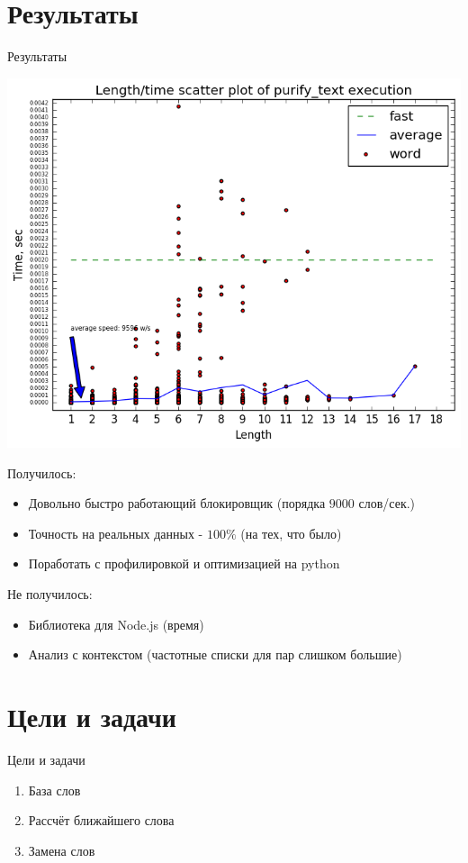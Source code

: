 \documentclass{beamer}
\begin{document}
\section{Результаты}
\begin{frame}[t]{Результаты}
    \begin{center}
        \includegraphics[width=0.70\linewidth]{../src/test/resources/plots/length_time_plot.png}
    \end{center}
\end{frame}
\begin{frame}
    Получилось:
    \begin{itemize}
        \item Довольно быстро работающий блокировщик (порядка $9000$ слов/сек.)
        \item Точность на реальных данных - $100 \%$ (на тех, что было)
        \item Поработать с профилировкой и оптимизацией на python
    \end{itemize}
    Не получилось:
    \begin{itemize}
        \item Библиотека для Node.js (время)
        \item Анализ с контекстом (частотные списки для пар слишком большие)
    \end{itemize}
\end{frame}

\section{Цели и задачи}
\begin{frame}[<+->]{Цели и задачи}
    \begin{enumerate}
        \item База слов
        \item Рассчёт ближайшего слова
        \item Замена слов
    \end{enumerate}
\end{frame}
\end{document}
